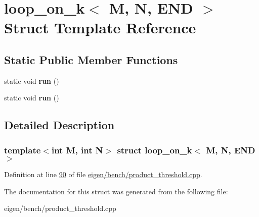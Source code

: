 \hypertarget{structloop__on__k_3_01_m_00_01_n_00_01_e_n_d_01_4}{}\section{loop\+\_\+on\+\_\+k$<$ M, N, E\+ND $>$ Struct Template Reference}
\label{structloop__on__k_3_01_m_00_01_n_00_01_e_n_d_01_4}
\subsection*{Static Public Member Functions}
\begin{DoxyCompactItemize}
\item 
\mbox{\label{structloop__on__k_3_01_m_00_01_n_00_01_e_n_d_01_4_a69dfe00234719b8962d4ee72b4dc7bb5}} 
static void {\bfseries run} ()
\item 
\mbox{\label{structloop__on__k_3_01_m_00_01_n_00_01_e_n_d_01_4_a69dfe00234719b8962d4ee72b4dc7bb5}} 
static void {\bfseries run} ()
\end{DoxyCompactItemize}


\subsection{Detailed Description}
\subsubsection*{template$<$int M, int N$>$\newline
struct loop\+\_\+on\+\_\+k$<$ M, N, E\+N\+D $>$}



Definition at line \hyperlink{eigen_2bench_2product__threshold_8cpp_source_l00090}{90} of file \hyperlink{eigen_2bench_2product__threshold_8cpp_source}{eigen/bench/product\+\_\+threshold.\+cpp}.



The documentation for this struct was generated from the following file\+:\begin{DoxyCompactItemize}
\item 
eigen/bench/product\+\_\+threshold.\+cpp\end{DoxyCompactItemize}
